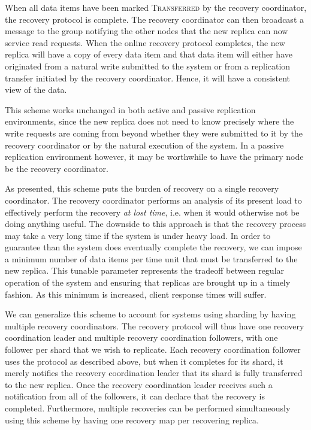 \documentclass[letterpaper,11pt]{article}
\begin{document}
When all data items have been marked \textsc{Transferred} by the recovery
coordinator, the recovery protocol is complete. The recovery coordinator can
then broadcast a message to the group notifying the other nodes that the new
replica can now service read requests. When the online recovery protocol
completes, the new replica will have a copy of every data item and that data
item will either have originated from a natural write submitted to the system
or from a replication transfer initiated by the recovery coordinator. Hence, it
will have a consistent view of the data.

This scheme works unchanged in both active and passive replication
environments, since the new replica does not need to know precisely where the
write requests are coming from beyond whether they were submitted to it by the
recovery coordinator or by the natural execution of the system. In a passive
replication environment however, it may be worthwhile to have the primary node
be the recovery coordinator.

As presented, this scheme puts the burden of recovery on a single recovery
coordinator. The recovery coordinator performs an analysis of its present load
to effectively perform the recovery \emph{at lost time}, i.e. when it would
otherwise not be doing anything useful. The downside to this approach is that
the recovery process may take a very long time if the system is under heavy
load. In order to guarantee than the system does eventually complete the
recovery, we can impose a minimum number of data items per time unit that must
be transferred to the new replica. This tunable parameter represents the
tradeoff between regular operation of the system and ensuring that replicas
are brought up in a timely fashion. As this minimum is increased, client
response times will suffer.

We can generalize this scheme to account for systems using sharding by having
multiple recovery coordinators. The recovery protocol will thus have one
recovery coordination leader and multiple recovery coordination followers, with
one follower per shard that we wish to replicate. Each recovery coordination
follower uses the protocol as described above, but when it completes for its
shard, it merely notifies the recovery coordination leader that its shard is
fully transferred to the new replica. Once the recovery coordination leader
receives such a notification from all of the followers, it can declare that the
recovery is completed.
Furthermore, multiple recoveries can be performed simultaneously using this
scheme by having one recovery map per recovering replica.
\end{document}
